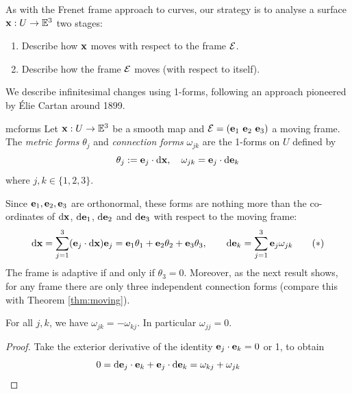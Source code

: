 

\goodbreak


As with the Frenet frame approach to curves, our strategy is to analyse a surface ${\mathbf{x}}:U\to\mathbb{E}^3$ two stages:
\begin{enumerate}
  \item Describe how ${\mathbf{x}}$ moves with respect to the frame $\mathcal{E}$.
  \item Describe how the frame $\mathcal{E}$ moves (with respect to itself). 
\end{enumerate}
We describe infinitesimal changes using 1-forms, following an approach pioneered by Élie Cartan around 1899.

\begin{defn}{}{mcforms}
	Let ${\mathbf{x}}:U\to\mathbb{E}^3$ be a smooth map and $\mathcal{E}=({\mathbf{e}}_1\ {\mathbf{e}}_2\ {\mathbf{e}}_3)$ a moving frame. The \emph{metric forms} $\theta_j$ and \emph{connection forms} $\omega_{jk}$ are the 1-forms on $U$ defined by
	\[
		\theta_j:={\mathbf{e}}_j\cdot\mathrm{d}{\mathbf{x}},\quad \omega_{jk}={\mathbf{e}}_j\cdot\mathrm{d}{\mathbf{e}}_k
	\]
	where $j,k\in\{1,2,3\}$.
\end{defn}

Since ${\mathbf{e}}_1,{\mathbf{e}}_2,{\mathbf{e}}_3$ are orthonormal, these forms are nothing more than the co-ordinates of $\mathrm{d}{\mathbf{x}}$, $\mathrm{d}{\mathbf{e}}_1$, $\mathrm{d}{\mathbf{e}}_2$ and $\mathrm{d}{\mathbf{e}}_3$ with respect to the moving frame:
\[
	\mathrm{d}{\mathbf{x}}=\sum_{j=1}^3({\mathbf{e}}_j\cdot\mathrm{d}{\mathbf{x}}){\mathbf{e}}_j={\mathbf{e}}_1\theta_1+{\mathbf{e}}_2\theta_2+{\mathbf{e}}_3\theta_3,\qquad \mathrm{d}{\mathbf{e}}_k=\sum_{j=1}^3{\mathbf{e}}_j\omega_{jk}\tag{$\ast$}
\]
The frame is adaptive if and only if $\theta_3=0$. Moreover, as the next result shows, for any frame there are only three independent connection forms (compare this with Theorem \ref{thm:moving}).

\begin{lemm}{}{}
	For all $j,k$, we have $\omega_{jk}=-\omega_{kj}$. In particular $\omega_{jj}=0$.
\end{lemm}

\begin{proof}
	Take the exterior derivative of the identity ${\mathbf{e}}_j\cdot{\mathbf{e}}_k=0$ or 1, to obtain
	\[
		0=\mathrm{d}{\mathbf{e}}_j\cdot{\mathbf{e}}_k+{\mathbf{e}}_j\cdot\mathrm{d}{\mathbf{e}}_k=\omega_{kj}+\omega_{jk} \tag*{\qedhere}
	\]
\end{proof}

